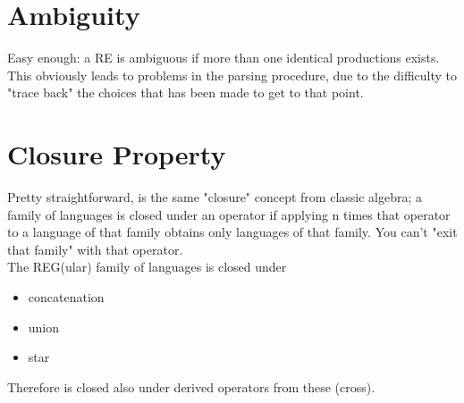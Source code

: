     \section{Ambiguity}
        Easy enough: a RE is ambiguous if more than one identical productions exists. This obviously leads to problems in the parsing procedure, due to the difficulty to "trace back" the choices that has been made to get to that point. 

    \section{Closure Property}
        Pretty straightforward, is the same "closure" concept from classic algebra; a family of languages is closed under an operator if applying n times that operator to a language of that family obtains only languages of that family. You can't "exit that family" with that operator.\\
        The REG(ular) family of languages is closed under
        \begin{itemize}
            \item concatenation
            \item union
            \item star
        \end{itemize}
        Therefore is closed also under derived operators from these (cross).
